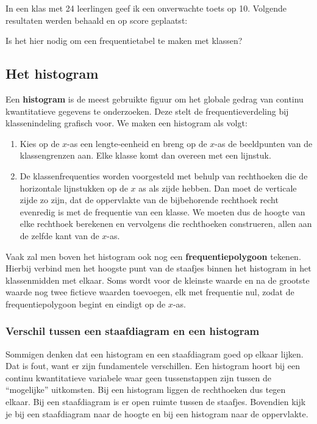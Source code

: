 \documentclass[12pt,twoside,a4paper]{article}
\begin{document}
\begin{oefening}
  In een klas met 24 leerlingen geef ik een onverwachte toets op 10. Volgende resultaten werden behaald en op score geplaatst:
  \begin{center}
  \end{center}
  Is het hier nodig om een frequentietabel te maken met klassen?
\end{oefening}

\subsection{Het histogram}

Een {\bf histogram} is de meest gebruikte figuur om het globale gedrag van continu
kwantitatieve gegevens te onderzoeken. Deze stelt de frequentieverdeling bij klassenindeling
grafisch voor. We maken een histogram als volgt:

\begin{enumerate}
  \item Kies op de $x$-as een lengte-eenheid en breng op de $x$-as de beeldpunten van de klassengrenzen aan. Elke klasse komt dan overeen met een lijnstuk.
  \item De klassenfrequenties worden voorgesteld met behulp van rechthoeken die de horizontale lijnstukken op de $x$ as als zijde hebben. Dan moet de verticale zijde zo zijn, dat de oppervlakte van de bijbehorende rechthoek recht evenredig is met de frequentie van een klasse. We moeten dus de hoogte van elke rechthoek berekenen en vervolgens die rechthoeken construeren, allen aan de zelfde kant van de $x$-as.
\end{enumerate}

Vaak zal men boven het histogram ook nog een {\bf frequentiepolygoon} tekenen. Hierbij verbind men het hoogste punt van de staafjes binnen het histogram in het klassenmidden met elkaar. Soms wordt voor de kleinste waarde en na de grootste waarde nog twee fictieve waarden toevoegen, elk met frequentie nul, zodat de frequentiepolygoon begint en eindigt op de $x$-as.

\subsubsection*{Verschil tussen een staafdiagram en een histogram}
Sommigen denken dat een histogram en een staafdiagram goed op elkaar lijken. Dat is fout, want er zijn fundamentele verschillen. Een histogram hoort bij een continu kwantitatieve variabele waar geen tussenstappen zijn tussen de “mogelijke” uitkomsten. Bij een histogram liggen de rechthoeken dus tegen elkaar. Bij een staafdiagram is er open ruimte tussen de staafjes. Bovendien kijk je bij een staafdiagram naar de hoogte en bij een histogram naar de oppervlakte.
\end{document}
